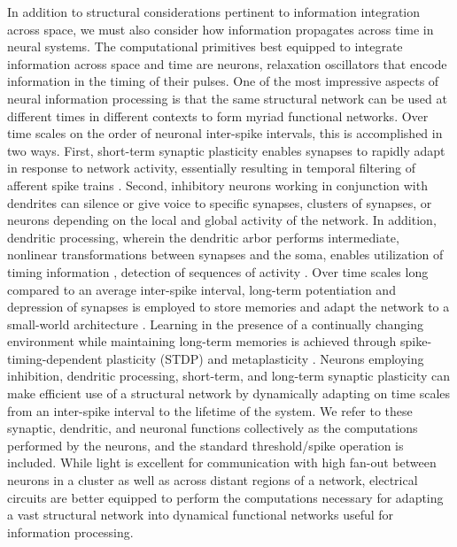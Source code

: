 \documentclass[twocolumn]{article}
\begin{document}
In addition to structural considerations pertinent to information integration across space, we must also consider how information propagates across time in neural systems. The computational primitives best equipped to integrate information across space and time are neurons, relaxation oscillators that encode information in the timing of their pulses. One of the most impressive aspects of neural information processing is that the same structural network can be used at different times in different contexts to form myriad functional networks. Over time scales on the order of neuronal inter-spike intervals, this is accomplished in two ways. First, short-term synaptic plasticity enables synapses to rapidly adapt in response to network activity, essentially resulting in temporal filtering of afferent spike trains \cite{abre2004}. Second, inhibitory neurons working in conjunction with dendrites can silence or give voice to specific synapses, clusters of synapses, or neurons depending on the local and global activity of the network. In addition, dendritic processing, wherein the dendritic arbor performs intermediate, nonlinear transformations between synapses and the soma, enables utilization of timing information \cite{vagu2005}, detection of sequences of activity \cite{haah2015}. Over time scales long compared to an average inter-spike interval, long-term potentiation and depression of synapses is employed to store memories and adapt the network to a small-world architecture \cite{shki2006}. Learning in the presence of a continually changing environment while maintaining long-term memories is achieved through spike-timing-dependent plasticity (STDP) \cite{somi2000,mage2012} and metaplasticity \cite{ab2008,fudr2005}. Neurons employing inhibition, dendritic processing, short-term, and long-term synaptic plasticity can make efficient use of a structural network by dynamically adapting on time scales from an inter-spike interval to the lifetime of the system. We refer to these synaptic, dendritic, and neuronal functions collectively as the computations performed by the neurons, and the standard threshold/spike operation is included. While light is excellent for communication with high fan-out between neurons in a cluster as well as across distant regions of a network, electrical circuits are better equipped to perform the computations necessary for adapting a vast structural network into dynamical functional networks useful for information processing. 
\end{document}
